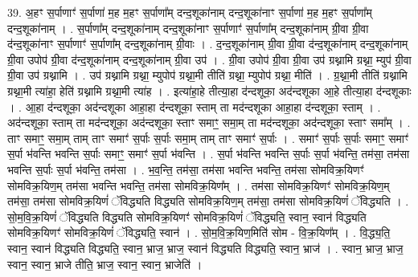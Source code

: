 \documentclass[17pt]{extarticle}
\begin{document}
39. अ॒हꣳ स॒र्पाणाꣳ॑ स॒र्पाणा॑ म॒ह म॒हꣳ स॒र्पाणा᳚म् दन्द॒शूका॑नाम् दन्द॒शूका॑नाꣳ स॒र्पाणा॑ म॒ह म॒हꣳ स॒र्पाणा᳚म् दन्द॒शूका॑नाम् । . स॒र्पाणा᳚म् दन्द॒शूका॑नाम् दन्द॒शूका॑नाꣳ स॒र्पाणाꣳ॑ स॒र्पाणा᳚म् दन्द॒शूका॑नाम् ग्री॒वा ग्री॒वा द॑न्द॒शूका॑नाꣳ स॒र्पाणाꣳ॑ स॒र्पाणा᳚म् दन्द॒शूका॑नाम् ग्री॒वाः । . द॒न्द॒शूका॑नाम् ग्री॒वा ग्री॒वा द॑न्द॒शूका॑नाम् दन्द॒शूका॑नाम् ग्री॒वा उपोप॑ ग्री॒वा द॑न्द॒शूका॑नाम् दन्द॒शूका॑नाम् ग्री॒वा उप॑ । . ग्री॒वा उपोप॑ ग्री॒वा ग्री॒वा उप॑ ग्रथ्नामि ग्रथ्ना॒ म्युप॑ ग्री॒वा ग्री॒वा उप॑ ग्रथ्नामि । . उप॑ ग्रथ्नामि ग्रथ्ना॒ म्युपोप॑ ग्रथ्ना॒मी तीति॑ ग्रथ्ना॒ म्युपोप॑ ग्रथ्ना॒ मीति॑ । . ग्र॒थ्ना॒मी तीति॑ ग्रथ्नामि ग्रथ्ना॒मी त्या॑हा॒ हेति॑ ग्रथ्नामि ग्रथ्ना॒मी त्या॑ह । . इत्या॑हा॒हे तीत्या॒हा द॑न्दशूका॒ अद॑न्दशूका आ॒हे तीत्या॒हा द॑न्दशूकाः । . आ॒हा द॑न्दशूका॒ अद॑न्दशूका आहा॒हा द॑न्दशूका॒ स्ताम् ता मद॑न्दशूका आहा॒हा द॑न्दशूका॒ स्ताम् । . अद॑न्दशूका॒ स्ताम् ता मद॑न्दशूका॒ अद॑न्दशूका॒ स्ताꣳ समाꣳ॒॒ समा॒म् ता मद॑न्दशूका॒ अद॑न्दशूका॒ स्ताꣳ समा᳚म् । . ताꣳ समाꣳ॒॒ समा॒म् ताम् ताꣳ समाꣳ॑ स॒र्पाः स॒र्पाः समा॒म् ताम् ताꣳ समाꣳ॑ स॒र्पाः । . समाꣳ॑ स॒र्पाः स॒र्पाः समाꣳ॒॒ समाꣳ॑ स॒र्पा भ॑वन्ति भवन्ति स॒र्पाः समाꣳ॒॒ समाꣳ॑ स॒र्पा भ॑वन्ति । . स॒र्पा भ॑वन्ति भवन्ति स॒र्पाः स॒र्पा भ॑वन्ति॒ तम॑सा॒ तम॑सा भवन्ति स॒र्पाः स॒र्पा भ॑वन्ति॒ तम॑सा । . भ॒व॒न्ति॒ तम॑सा॒ तम॑सा भवन्ति भवन्ति॒ तम॑सा सोमविक्र॒यिणꣳ॑ सोमविक्र॒यिण॒म् तम॑सा भवन्ति भवन्ति॒ तम॑सा सोमविक्र॒यिण᳚म् । . तम॑सा सोमविक्र॒यिणꣳ॑ सोमविक्र॒यिण॒म् तम॑सा॒ तम॑सा सोमविक्र॒यिणं॑ ॅविद्ध्यति विद्ध्यति सोमविक्र॒यिण॒म् तम॑सा॒ तम॑सा सोमविक्र॒यिणं॑ ॅविद्ध्यति । . सो॒म॒वि॒क्र॒यिणं॑ ॅविद्ध्यति विद्ध्यति सोमविक्र॒यिणꣳ॑ सोमविक्र॒यिणं॑ ॅविद्ध्यति॒ स्वान॒ स्वान॑ विद्ध्यति सोमविक्र॒यिणꣳ॑ सोमविक्र॒यिणं॑ ॅविद्ध्यति॒ स्वान॑ । . सो॒म॒वि॒क्र॒यिण॒मिति॑ सोम - वि॒क्र॒यिण᳚म् । . वि॒द्ध्य॒ति॒ स्वान॒ स्वान॑ विद्ध्यति विद्ध्यति॒ स्वान॒ भ्राज॒ भ्राज॒ स्वान॑ विद्ध्यति विद्ध्यति॒ स्वान॒ भ्राज॑ । . स्वान॒ भ्राज॒ भ्राज॒ स्वान॒ स्वान॒ भ्राजे तीति॒ भ्राज॒ स्वान॒ स्वान॒ भ्राजेति॑ । \newline
\pagebreak
{}
\end{document}
